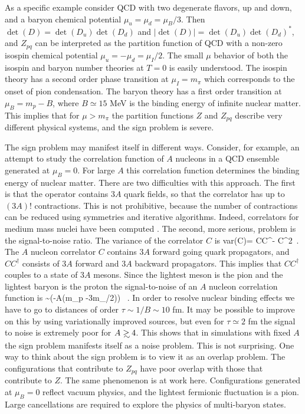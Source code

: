 As a specific example consider QCD with two degenerate flavors, up and
down, and a baryon chemical potential $\mu_u=\mu_d=\mu_B/3$. Then 
$\det(D)=\det(D_u)\det(D_d)$ and $|\det(D)|=\det(D_u)\det(D_d)^*$, and
$Z_{pq}$ can be interpreted as the partition function of QCD with a
non-zero isospin chemical potential $\mu_u=-\mu_d=\mu_I/2$. The small
$\mu$ behavior of both the isospin and baryon number theories at $T=0$
is easily understood. The isospin theory has a second order phase
transition at $\mu_I=m_\pi$ which corresponds to the onset of pion
condensation. The baryon theory has a first order transition at
$\mu_B=m_p-B$, where $B\simeq 15$ MeV is the binding energy of infinite
nuclear matter. This implies that for $\mu>m_\pi$ the partition functions
$Z$ and $Z_{pq}$ describe very different physical systems, and the 
sign problem is severe. 

 The sign problem may manifest itself in different ways. Consider,
for example, an attempt to study the correlation function of $A$ 
nucleons in a QCD ensemble generated at $\mu_B=0$. For large $A$ 
this correlation function determines the binding energy of nuclear 
matter. There are two difficulties with this approach. The first is 
that the operator contains $3A$ quark fields, so that the correlator
has up to $(3A)!$ contractions. This is not prohibitive, because
the number of contractions can be reduced using symmetries and 
iterative algorithms. Indeed, correlators for medium mass nuclei 
have been computed \cite{Lin:2014}. The second, more serious, problem
is the signal-to-noise ratio. The variance of the correlator $C$ is 
\be 
 {\rm var}(C)= \langle CC^\dagger \rangle - \langle C\rangle^2\, . 
\ee
The $A$ nucleon correlator $C$ contains $3A$ forward going quark propagators,
and $CC^\dagger$ consists of $3A$ forward and $3A$ backward propagators. This
implies that $CC^\dagger$ couples to a state of $3A$ mesons. Since the lightest
meson is the pion and the lightest baryon is the proton the signal-to-noise
of an $A$ nucleon correlation function is 
\be 
  \sim \exp(-A(m_p -3m_\pi/2)\tau) \, . 
\ee
In order to resolve nuclear binding effects we have to go to distances
of order $\tau\sim 1/B\sim 10$ fm. It may be possible to improve on this
by using variationally improved sources, but even for $\tau\simeq 2$ fm the 
signal to noise is extremely poor for $A\gsim 4$. This shows that in 
simulations with fixed $A$ the sign problem manifests itself as a 
noise problem. This is not surprising. One way to think about the 
sign problem is to view it as an overlap problem. The configurations
that contribute to $Z_{pq}$ have poor overlap with those that contribute
to $Z$. The same phenomenon is at work here. Configurations generated
at $\mu_B=0$ reflect vacuum physics, and the lightest fermionic 
fluctuation is a pion. Large cancellations are required to explore the
physics of multi-baryon states. 


